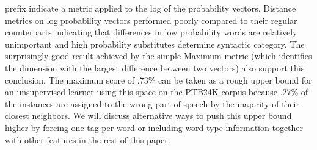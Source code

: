 prefix indicate a metric applied to the log of the probability
vectors.  Distance metrics on log probability vectors performed poorly
compared to their regular counterparts indicating that differences in
low probability words are relatively unimportant and high probability
substitutes determine syntactic category.  The surprisingly good
result achieved by the simple Maximum metric (which identifies the
dimension with the largest difference between two vectors) also
support this conclusion.  The maximum score of .73\% can be taken as a
rough upper bound for an unsupervised learner using this space on the
PTB24K corpus because .27\% of the instances are assigned to the wrong
part of speech by the majority of their closest neighbors.  We will
discuss alternative ways to push this upper bound higher by forcing
one-tag-per-word or including word type information together with
other features in the rest of this paper.


